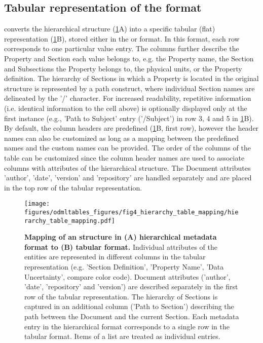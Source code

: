 \subsection{Tabular representation of the  format} 
\label{sec:tabular_format}

 converts the hierarchical  structure (\cref{fig:tree_and_table}A) into a specific tabular (flat) representation (\cref{fig:tree_and_table}B), stored either in the  or  format. In this format, each row corresponds to one particular value entry. The columns further describe the Property and Section each value belongs to, e.g. the Property name, the Section and Subsections the Property belongs to, the physical units, or the Property definition. The hierarchy of Sections in which a Property is located in the original  structure is represented by a path construct, where individual Section names are delineated by the '/' character. For increased readability, repetitive information (i.e. identical information to the cell above) is optionally displayed only at the first instance (e.g., 'Path to Subject' entry ('/Subject') in row 3, 4 and 5 in \cref{fig:tree_and_table}B). By default, the  column headers are predefined (\cref{fig:tree_and_table}B, first row), however the header names can also be customized as long as a mapping between the predefined names and the custom names can be provided. The order of the columns of the table can be customized since the column header names are used to associate columns with attributes of the hierarchical  structure. The  Document attributes 'author', 'date', 'version' and 'repository' are handled separately and are placed in the top row of the tabular  representation.

\begin{figure}[!ht]
\begin{center}
\texttt{[image: figures/odmltables\_figures/fig4\_hierarchy\_table\_mapping/hierarchy\_table\_mapping.pdf]}
\caption[Mapping between hierarchical and tabular metadata format]{{\label{fig:tree_and_table}
\textbf{Mapping of an  structure in (A) hierarchical metadata format to (B) tabular format.} Individual attributes of the  entities are represented in different columns in the tabular representation (e.g. 'Section Definition', 'Property Name', 'Data Uncertainty', compare color code). Document attributes ('author', 'date', 'repository' and 'version') are described separately in the first row of the tabular representation. The hierarchy of Sections is captured in an additional column ('Path to Section') describing the path between the  Document and the current Section. Each metadata entry in the hierarchical format corresponds to a single row in the tabular format. Items of a list are treated as individual entries.
}}
\end{center}
\end{figure}

